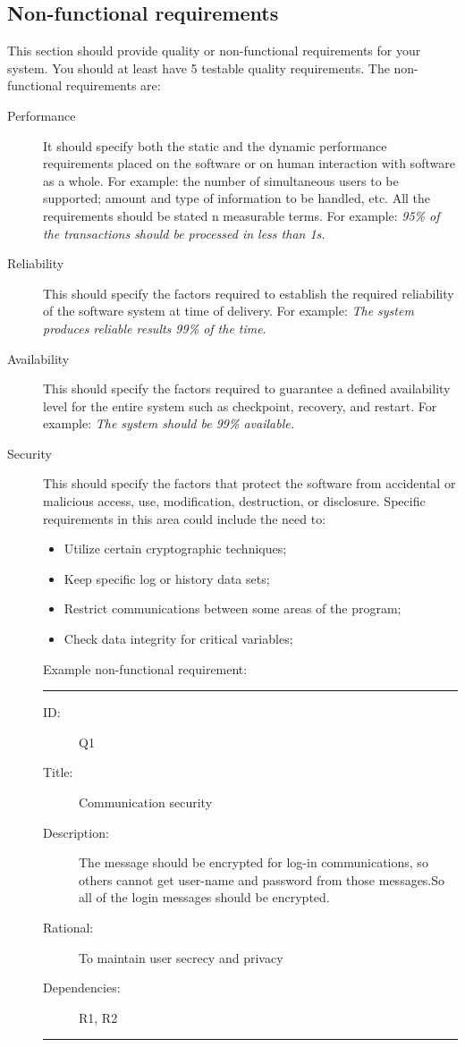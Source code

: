 \subsection{Non-functional requirements} %
\label{sub:non_functional_requirements}
This section should provide quality or non-functional requirements for your system. You should at least have 5 testable quality requirements. The non-functional requirements are:
\begin{description}
	\item[Performance] It should specify both the static and the dynamic performance requirements placed on the software or on human interaction with software as a whole. For example: the number of simultaneous users to be supported; amount and type of information to be handled, etc. All the requirements should be stated n measurable terms. For example: \emph{95\% of the transactions should be processed in less than 1s.}

	\item[Reliability] This should specify the factors required to establish the required reliability of the software system at time of delivery. For example: \emph{The system produces reliable results 99\% of the time}.

	\item[Availability] This should specify the factors required to guarantee a defined availability level for the entire system such as checkpoint, recovery, and restart. For example: \emph{The system should be 99\% available.}

	\item[Security] This should specify the factors that protect the software from accidental or malicious access, use, modification, destruction, or disclosure. Specific requirements in this area could include the need to:
	\begin{itemize}
		\item Utilize certain cryptographic techniques;
		\item Keep specific log or history data sets;
		\item Restrict communications between some areas of the program;
		\item Check data integrity for critical variables;
	\end{itemize}

	Example non-functional requirement:
	\hrule
	\begin{description}
		\item[ID:] Q1
		\item[Title:] Communication security
		\item[Description:] The message should be encrypted for log-in communications, so others cannot get user-name and password from those messages.So all of the login messages should be encrypted.
		\item[Rational:] To maintain user secrecy and privacy
		\item[Dependencies:] R1, R2
	\end{description}
	\hrule
\end{description}
